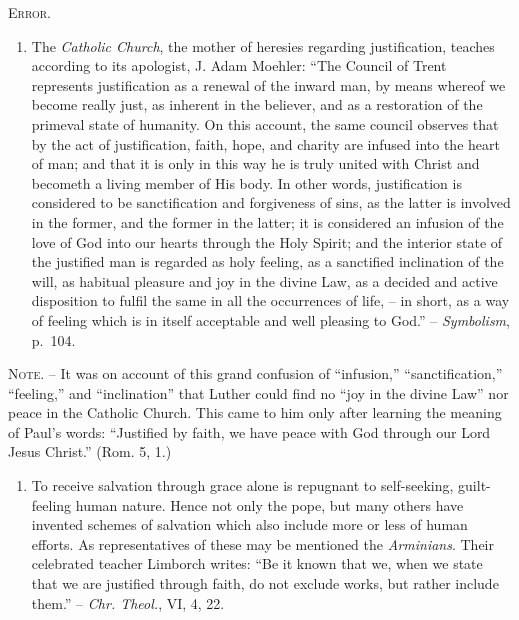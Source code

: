 \documentclass[
]{book}
\providecommand{\tightlist}{%
  \setlength{\itemsep}{0pt}\setlength{\parskip}{0pt}}
\begin{document}
\begin{center}
\textsc{Error.}
\end{center}

\begin{enumerate}
\def\labelenumi{\arabic{enumi}.}
\tightlist
\item
  The \emph{Catholic Church}, the mother of heresies regarding justification, teaches according to its apologist, J. Adam Moehler: ``The Council of Trent represents justification as a renewal of the inward man, by means whereof we become really just, as inherent in the believer, and as a restoration of the primeval state of humanity. On this account, the same council observes that by the act of justification, faith, hope, and charity are infused into the heart of man; and that it is only in this way he is truly united with Christ and becometh a living member of His body. In other words, justification is considered to be sanctification and forgiveness of sins, as the latter is involved in the former, and the former in the latter; it is considered an infusion of the love of God into our hearts through the Holy Spirit; and the interior state of the justified man is regarded as holy feeling, as a sanctified inclination of the will, as habitual pleasure and joy in the divine Law, as a decided and active disposition to fulfil the same in all the occurrences of life, -- in short, as a way of feeling which is in itself acceptable and well pleasing to God.'' -- \emph{Symbolism}, p.~104.
\end{enumerate}

\textsc{Note.} -- It was on account of this grand confusion of ``infusion,'' ``sanctification,'' ``feeling,'' and ``inclination'' that Luther could find no ``joy in the divine Law'' nor peace in the Catholic Church. This came to him only after learning the meaning of Paul's words: ``Justified by faith, we have peace with God through our Lord Jesus Christ.'' (Rom. 5, 1.)

\begin{enumerate}
\def\labelenumi{\arabic{enumi}.}
\setcounter{enumi}{1}
\tightlist
\item
  To receive salvation through grace alone is repugnant to self-seeking, guilt-feeling human nature. Hence not only the pope, but many others have invented schemes of salvation which also include more or less of human efforts. As representatives of these may be mentioned the \emph{Arminians}. Their celebrated teacher Limborch writes: ``Be it known that we, when we state that we are justified through faith, do not exclude works, but rather include them.'' -- \emph{Chr. Theol.}, VI, 4, 22.
\end{enumerate}
\end{document}

